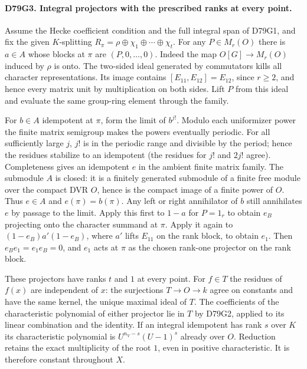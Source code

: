 \paragraph{D79G3. Integral projectors with the prescribed ranks at every point.}
Assume the Hecke coefficient condition and the full integral span
of D79G1, and fix the given $K$-splitting
$R_\pi=\rho\oplus\chi_1\oplus\cdots\oplus\chi_t$.
For any $P\in M_r(O)$ there is $a\in A$ whose blocks at
$\pi$ are $(P,0,\ldots,0)$. Indeed the map
$O[G]\to M_r(O)$ induced by $\rho$ is onto. The two-sided ideal
generated by commutators kills all character representations.
Its image contains $[E_{11},E_{12}]=E_{12}$, since $r\ge2$,
and hence every matrix unit by multiplication on both sides.
Lift $P$ from this ideal and evaluate the same group-ring element
through the family.

For $b\in A$ idempotent at $\pi$, form the limit of $b^{j!}$.
Modulo each uniformizer power the finite matrix semigroup makes
the powers eventually periodic. For all sufficiently large $j$,
$j!$ is in the periodic range and divisible by the period; hence
the residues stabilize to an idempotent (the residues for $j!$
and $2j!$ agree). Completeness gives an idempotent $e$ in the
ambient finite matrix family. The submodule $A$ is closed:
it is a finitely generated submodule of a finite free module
over the compact DVR $O$, hence is the compact image of a finite
power of $O$. Thus $e\in A$ and $e(\pi)=b(\pi)$. Any left
or right annihilator of $b$ still annihilates $e$ by passage to
the limit. Apply this first to $1-a$ for $P=1_r$ to obtain
$e_B$ projecting onto the character summand at $\pi$. Apply it
again to $(1-e_B)a'(1-e_B)$, where $a'$ lifts $E_{11}$ on the
rank block, to obtain $e_1$. Then $e_Be_1=e_1e_B=0$, and $e_1$
acts at $\pi$ as the chosen rank-one projector on the rank block.

These projectors have ranks $t$ and $1$ at every point.
For $f\in T$ the residues of $f(x)$ are independent of $x$:
the surjections $T\to O\to k$ agree on constants and have the
same kernel, the unique maximal ideal of $T$. The coefficients
of the characteristic polynomial of either projector lie in $T$
by D79G2, applied to its linear combination and the identity.
If an integral idempotent has rank $s$ over $K$ its characteristic
polynomial is $U^{n_V-s}(U-1)^s$ already over $O$. Reduction
retains the exact multiplicity of the root $1$, even in positive
characteristic. It is therefore constant throughout $X$.

